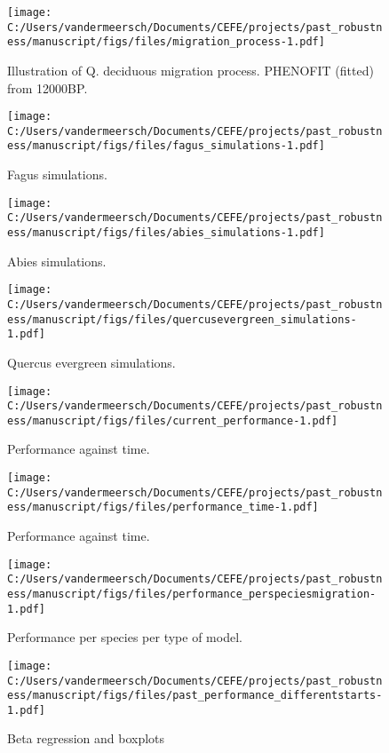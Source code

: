 \documentclass[
]{article}
\begin{document}
\begin{figure}
\centering
\texttt{[image: C:/Users/vandermeersch/Documents/CEFE/projects/past\_robustness/manuscript/figs/files/migration\_process-1.pdf]}
\caption{Illustration of Q. deciduous migration process. PHENOFIT
(fitted) from 12000BP.}
\end{figure}

\begin{figure}
\centering
\texttt{[image: C:/Users/vandermeersch/Documents/CEFE/projects/past\_robustness/manuscript/figs/files/fagus\_simulations-1.pdf]}
\caption{Fagus simulations.}
\end{figure}

\begin{figure}
\centering
\texttt{[image: C:/Users/vandermeersch/Documents/CEFE/projects/past\_robustness/manuscript/figs/files/abies\_simulations-1.pdf]}
\caption{Abies simulations.}
\end{figure}

\begin{figure}
\centering
\texttt{[image: C:/Users/vandermeersch/Documents/CEFE/projects/past\_robustness/manuscript/figs/files/quercusevergreen\_simulations-1.pdf]}
\caption{Quercus evergreen simulations.}
\end{figure}

\begin{figure}
\centering
\texttt{[image: C:/Users/vandermeersch/Documents/CEFE/projects/past\_robustness/manuscript/figs/files/current\_performance-1.pdf]}
\caption{Performance against time.}
\end{figure}

\begin{figure}
\centering
\texttt{[image: C:/Users/vandermeersch/Documents/CEFE/projects/past\_robustness/manuscript/figs/files/performance\_time-1.pdf]}
\caption{Performance against time.}
\end{figure}

\begin{figure}
\centering
\texttt{[image: C:/Users/vandermeersch/Documents/CEFE/projects/past\_robustness/manuscript/figs/files/performance\_perspeciesmigration-1.pdf]}
\caption{Performance per species per type of model.}
\end{figure}

\begin{figure}
\centering
\texttt{[image: C:/Users/vandermeersch/Documents/CEFE/projects/past\_robustness/manuscript/figs/files/past\_performance\_differentstarts-1.pdf]}
\caption{Beta regression and boxplots}
\end{figure}
\end{document}
